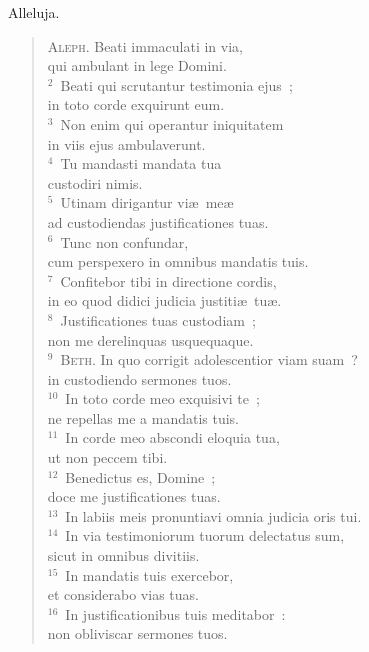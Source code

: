 \bchapter
\lettrine[lines=3,image=true,loversize=0.05,lraise=-0.03]{A}{}lleluja. \begin{flushleft}\begin{verse}\vspace{6pt}\textsc{Aleph.} Beati immaculati in via,\\ qui ambulant in lege Domini.\\
${}^{2}$~Beati qui scrutantur testimonia ejus~;\\ in toto corde exquirunt eum.\\
${}^{3}$~Non enim qui operantur iniquitatem\\ in viis ejus ambulaverunt.\\
${}^{4}$~Tu mandasti mandata tua\\ custodiri nimis.\\
${}^{5}$~Utinam dirigantur vi\ae\ me\ae \\ ad custodiendas justificationes tuas.\\
${}^{6}$~Tunc non confundar,\\ cum perspexero in omnibus mandatis tuis.\\
${}^{7}$~Confitebor tibi in directione cordis,\\ in eo quod didici judicia justiti\ae\ tu\ae .\\
${}^{8}$~Justificationes tuas custodiam~;\\ non me derelinquas usquequaque.\\
${}^{9}$~\textsc{Beth.} In quo corrigit adolescentior viam suam~?\\ in custodiendo sermones tuos.\\
${}^{10}$~In toto corde meo exquisivi te~;\\ ne repellas me a mandatis tuis.\\
${}^{11}$~In corde meo abscondi eloquia tua,\\ ut non peccem tibi.\\
${}^{12}$~Benedictus es, Domine~;\\ doce me justificationes tuas.\\
${}^{13}$~In labiis meis pronuntiavi omnia judicia oris tui.\\
${}^{14}$~In via testimoniorum tuorum delectatus sum,\\ sicut in omnibus divitiis.\\
${}^{15}$~In mandatis tuis exercebor,\\ et considerabo vias tuas.\\
${}^{16}$~In justificationibus tuis meditabor~:\\ non obliviscar sermones tuos.\\

\end{verse}
\end{flushleft}
